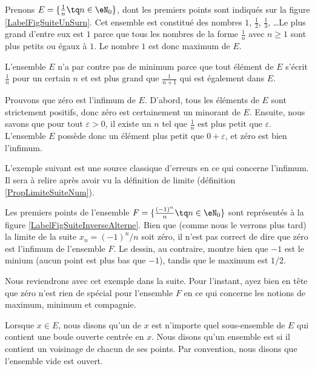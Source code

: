 \begin{example}
	Prenons $E=\{ \frac{1}{ n }\tq n\in\eN_0 \}$, dont les premiers points sont indiqués sur la figure \ref{LabelFigSuiteUnSurn}. Cet ensemble est constitué des nombres $1$, $\frac{ 1 }{2}$, $\frac{1}{ 3 }$, \ldots Le plus grand d'entre eux est $1$ parce que tous les nombres de la forme $\frac{1}{ n }$ avec $n\geq 1$ sont plus petits ou égaux à $1$. Le nombre $1$ est donc maximum de $E$.

	L'ensemble $E$ n'a par contre pas de minimum parce que tout élément de $E$ s'écrit $\frac{1}{ n }$ pour un certain $n$ et est plus grand que $\frac{1}{ n+1 }$ qui est également dans $E$.

	Prouvons que zéro est l'infimum de $E$. D'abord, tous les éléments de $E$ sont strictement positifs, donc zéro est certainement un minorant de $E$. Ensuite, nous savons que pour tout $\varepsilon>0$, il existe un $n$ tel que $\frac{1}{ n }$ est plus petit que $\varepsilon$. L'ensemble $E$ possède donc un élément plus petit que $0+\varepsilon$, et zéro est bien l'infimum.
\end{example}

\newcommand{\CaptionFigSuiteUnSurn}{Les premiers points du type $x_n=1/n$.}


L'exemple suivant est une source classique d'erreurs en ce qui concerne l'infimum. Il sera à relire après avoir vu la définition de limite (définition \ref{PropLimiteSuiteNum}).

\begin{example}
	Les premiers points de l'ensemble $F=\{ \frac{ (-1)^n }{ n }\tq n\in\eN_0 \}$ sont représentés à la figure \ref{LabelFigSuiteInverseAlterne}. Bien que (comme nous le verrons plus tard) la limite de la suite $x_n=(-1)^n/n$ soit zéro, il n'est pas correct de dire que zéro est l'infimum de l'ensemble $F$. Le dessin, au contraire, montre bien que $-1$ est le minium (aucun point est plus bas que $-1$), tandis que le maximum est $1/2$.

	Nous reviendrons avec cet exemple dans la suite. Pour l'instant, ayez bien en tête que zéro n'est rien de spécial pour l'ensemble $F$ en ce qui concerne les notions de maximum, minimum et compagnie.
\end{example}
\newcommand{\CaptionFigSuiteInverseAlterne}{Les quelques premiers points du type $(-1)^n/n$.}


Lorsque $x\in E$, nous disons qu'un  de $x$ est n'importe quel sous-ensemble de $E$ qui contient une boule ouverte centrée en $x$. Nous disons qu'un ensemble est  si il contient un voisinage de chacun de ses points. Par convention, nous disons que l'ensemble vide est ouvert.

